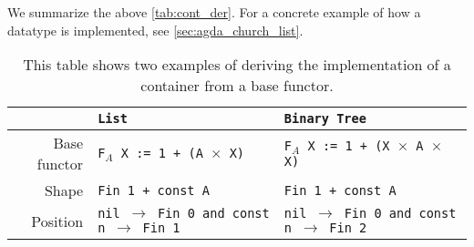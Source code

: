 We summarize the above \autoref{tab:cont_der}.
For a concrete example of how a datatype is implemented, see \autoref{sec:agda_church_list}.
\begin{table}[h]
  \centering
  \begin{tabular}{|r|l|l|}\hline
     & \tt{List} &  \tt{Binary Tree} \\\hline
    Base functor         & \tt{F$_A$ X := 1 + (A $\times$ X)}  & \tt{F$_A$ X := 1 + (X $\times$ A $\times$ X)} \\\hline
    Shape  & \tt{Fin 1 + const A} & \tt{Fin 1 + const A} \\\hline
    Position & \tt{nil $\to$ Fin 0 and const n $\to$ Fin 1} & \tt{nil $\to$ Fin 0 and const n $\to$ Fin 2} \\\hline
  \end{tabular}
  \caption{This table shows two examples of deriving the implementation of a container from a base functor.}
  \label{tab:cont_der}
\end{table}
